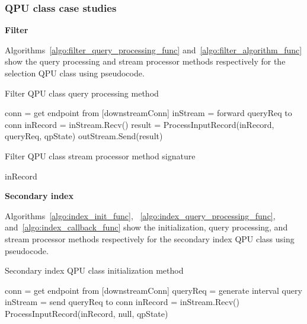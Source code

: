\subsubsection{QPU class case studies}
\label{sec:qpu_class_examples}

\textbf{Filter}

Algorithms~\ref{algo:filter_query_processing_func} and~\ref{algo:filter_algorithm_func} show the query processing and
stream processor methods respectively for the selection QPU class using pseudocode.


\begin{algorithm}
\caption{Filter QPU class query processing method}
\label{algo:filter_query_processing_func}
\begin{algorithmic}
\State conn = get endpoint from [downstreamConn] 
\State inStream = forward queryReq to conn
\State inRecord = inStream.Recv()
\State result = ProcessInputRecord(inRecord, queryReq, qpState)
\State outStream.Send(result)
\EndIf
\EndWhile
\EndFunction
\end{algorithmic}
\end{algorithm}

\begin{algorithm}
\caption{Filter QPU class stream processor method signature}
\label{algo:filter_algorithm_func}
\begin{algorithmic}
\State \Return inRecord
\Else
\State \Return []
\EndIf
\EndFunction
\end{algorithmic}
\end{algorithm}


\bigskip
\noindent
\textbf{Secondary index}

Algorithms~\ref{algo:index_init_func}, ~\ref{algo:index_query_processing_func}, and~\ref{algo:index_callback_func}
show the initialization, query processing, and stream processor methods respectively for the secondary index QPU
class using pseudocode.

\begin{algorithm}
\caption{Secondary index QPU class initialization method}
\label{algo:index_init_func}
\begin{algorithmic}
\State conn = get endpoint from [downstreamConn] 
\State queryReq = generate interval query
\State inStream = send queryReq to conn
\State inRecord = inStream.Recv()
\State ProcessInputRecord(inRecord, null, qpState)
\EndWhile
\EndFunction
\end{algorithmic}
\end{algorithm}

